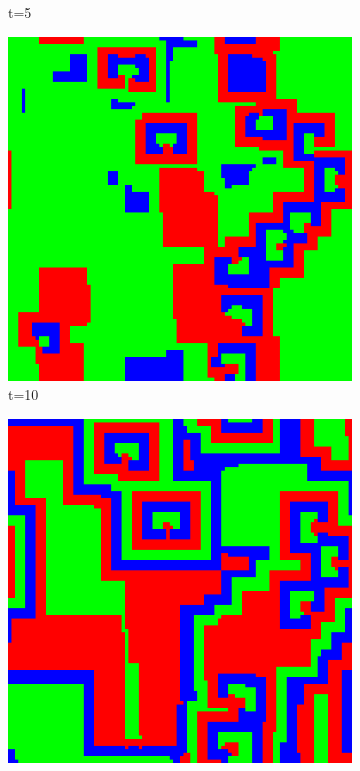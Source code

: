 \documentclass[a4paper, 11pt]{article}
\begin{document}
\begin{landscape}
\begin{figure}[H]
\begin{subfigure}{.20\textwidth}
  \caption{t=5}
\end{subfigure}%
\begin{subfigure}{.20\textwidth}
  \centering
  \includegraphics[width=0.95\linewidth]{ROCK_PAPER_SCISSORS_MOORE_100x100_HighRockPop50_t10}
  \caption{t=10}
\end{subfigure}%
\begin{subfigure}{.20\textwidth}
  \centering
  \includegraphics[width=0.95\linewidth]{ROCK_PAPER_SCISSORS_MOORE_100x100_HighRockPop50_t20}

\end{subfigure}
\end{figure}
\end{landscape}
\end{document}
